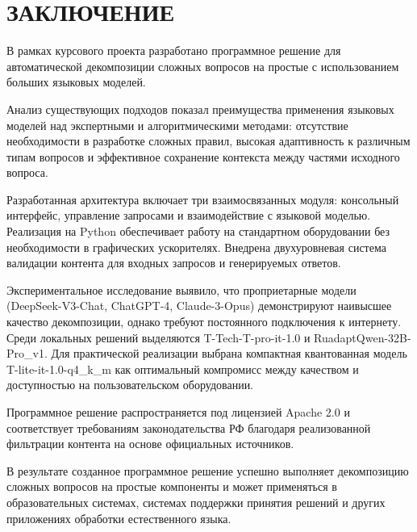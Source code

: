 \part*{ЗАКЛЮЧЕНИЕ}

В рамках курсового проекта разработано программное решение для автоматической декомпозиции сложных вопросов на простые с использованием больших языковых моделей. 

Анализ существующих подходов показал преимущества применения языковых моделей над экспертными и алгоритмическими методами: отсутствие необходимости в разработке сложных правил, высокая адаптивность к различным типам вопросов и эффективное сохранение контекста между частями исходного вопроса.

Разработанная архитектура включает три взаимосвязанных модуля: консольный интерфейс, управление запросами и взаимодействие с языковой моделью. Реализация на Python обеспечивает работу на стандартном оборудовании без необходимости в графических ускорителях. Внедрена двухуровневая система валидации контента для входных запросов и генерируемых ответов.

Экспериментальное исследование выявило, что проприетарные модели (DeepSeek-V3-Chat, ChatGPT-4, Claude-3-Opus) демонстрируют наивысшее качество декомпозиции, однако требуют постоянного подключения к интернету. Среди локальных решений выделяются T-Tech-T-pro-it-1.0 и RuadaptQwen-32B-Pro\_v1. Для практической реализации выбрана компактная квантованная модель T-lite-it-1.0-q4\_k\_m как оптимальный компромисс между качеством и доступностью на пользовательском оборудовании.

Программное решение распространяется под лицензией Apache 2.0 и соответствует требованиям законодательства РФ благодаря реализованной фильтрации контента на основе официальных источников.

В результате созданное программное решение успешно выполняет декомпозицию сложных вопросов на простые компоненты и может применяться в образовательных системах, системах поддержки принятия решений и других приложениях обработки естественного языка.